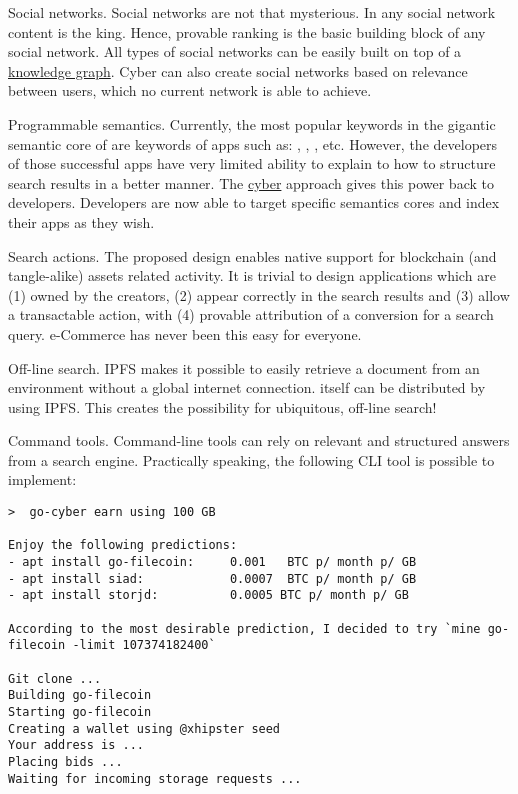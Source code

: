 \documentclass[8pt,oneside]{amsart}
\newcommand{\linkred}[2]{\href{#1}{\color{red}{#2}}}
\begin{document}
Social networks. Social networks are not that mysterious. In any social network content is the king. Hence, provable ranking is the basic building block of any social network. All types of social networks can be easily built on top of a {\hyperref[knowledge-graph]{knowledge graph}}. Cyber can also create social networks based on relevance between users, which no current network is able to achieve.

Programmable semantics. Currently, the most popular keywords in the gigantic semantic core of \linkred{https://google.com}{Google} are keywords of apps such as: \linkred{https://youtube.com}{Youtube}, \linkred{https://facebook.com}{Facebook}, \linkred{https://github.com}{GitHub}, etc. However, the developers of those successful apps have very limited ability to explain to \linkred{https://google.com}{Google} how to structure search results in a better manner. The {\hyperref[cyber]{cyber}} approach gives this power back to developers. Developers are now able to target specific semantics cores and index their apps as they wish.

Search actions. The proposed design enables native support for blockchain (and tangle-alike) assets related activity. It is trivial to design applications which are (1) owned by the creators, (2) appear correctly in the search results and (3) allow a transactable action, with (4) provable attribution of a conversion for a search query. e-Commerce has never been this easy for everyone.

Off-line search. IPFS makes it possible to easily retrieve a document from an environment without a global internet connection. \linkred{https://github.com/cybercongress/go-cyber}{go-cyber} itself can be distributed by using IPFS. This creates the possibility for ubiquitous, off-line search!

Command tools. Command-line tools can rely on relevant and structured answers from a search engine. Practically speaking, the following CLI tool is possible to implement:

\begin{lstlisting}
>  go-cyber earn using 100 GB

Enjoy the following predictions:
- apt install go-filecoin:     0.001   BTC p/ month p/ GB
- apt install siad:            0.0007  BTC p/ month p/ GB
- apt install storjd:          0.0005 BTC p/ month p/ GB

According to the most desirable prediction, I decided to try `mine go-filecoin -limit 107374182400`

Git clone ...
Building go-filecoin
Starting go-filecoin
Creating a wallet using @xhipster seed
Your address is ...
Placing bids ...
Waiting for incoming storage requests ...
\end{lstlisting}
\end{document}
